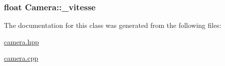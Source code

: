 \hypertarget{class_camera_a9062fdde515a49bf8db963ac46be9942}{
\subsubsection[{\+\_\+vitesse}]{\setlength{\rightskip}{0pt plus 5cm}float Camera\+::\+\_\+vitesse\hspace{0.3cm}{\ttfamily [protected]}}}\label{class_camera_a9062fdde515a49bf8db963ac46be9942}


The documentation for this class was generated from the following files\+:\begin{DoxyCompactItemize}
\item 
\hyperlink{camera_8hpp}{camera.\+hpp}\item 
\hyperlink{camera_8cpp}{camera.\+cpp}\end{DoxyCompactItemize}
